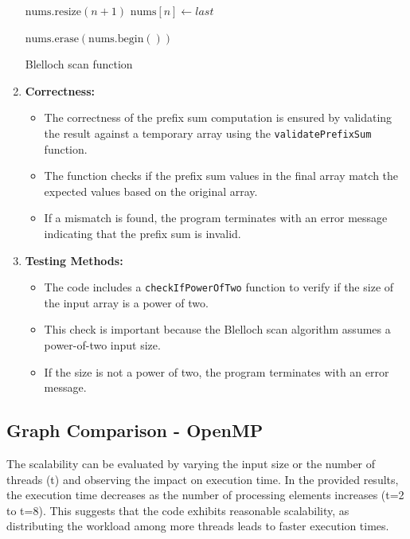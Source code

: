 \begin{enumerate}
\begin{center}
\begin{algorithm}[H]
{            
            $\text{nums.resize}(n + 1)$\;
            $\text{nums}[n] \gets last$\;
            
            $\text{nums.erase}(\text{nums.begin}())$\;
        }
        
        \caption{Blelloch scan function}
    \end{algorithm}
\end{center}

  \item \textbf{Correctness:}
  \begin{itemize}
    \item The correctness of the prefix sum computation is ensured by validating the result against a temporary array using the \lstinline|validatePrefixSum| function.
    \item The function checks if the prefix sum values in the final array match the expected values based on the original array.
    \item If a mismatch is found, the program terminates with an error message indicating that the prefix sum is invalid.
  \end{itemize}

  \item \textbf{Testing Methods:}
  \begin{itemize}
    \item The code includes a \lstinline|checkIfPowerOfTwo| function to verify if the size of the input array is a power of two.
    \item This check is important because the Blelloch scan algorithm assumes a power-of-two input size.
    \item If the size is not a power of two, the program terminates with an error message.
  \end{itemize}
\end{enumerate}

\subsection{Graph Comparison - OpenMP}
The scalability can be evaluated by varying the input size or the number of threads (t) and observing the impact on execution time. In the provided results, the execution time decreases as the number of processing elements increases (t=2 to t=8). This suggests that the code exhibits reasonable scalability, as distributing the workload among more threads leads to faster execution times.

